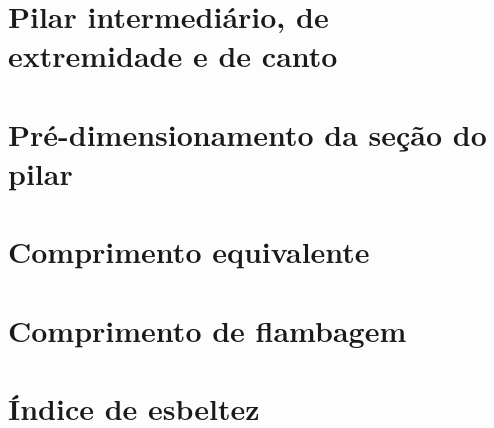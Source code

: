 \documentclass[12pt, a4paper]{article}
\begin{document}
	

	\section{Pilar intermediário, de extremidade e de canto}
	

	\section{Pré-dimensionamento da seção do pilar}
	

	\section{Comprimento equivalente}
	

	\section{Comprimento de flambagem}
	

	\section{Índice de esbeltez}
	
\end{document}
